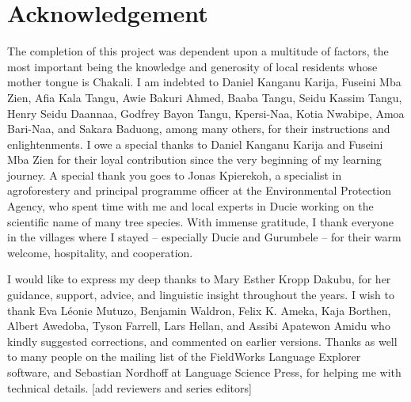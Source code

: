 \chapter*{Acknowledgement}
\label{sec:acknow}


The completion of this project was dependent upon a multitude of factors, the 
most important being  the  knowledge and generosity of local residents whose 
mother tongue is Chakali. I am  indebted to  Daniel Kanganu Karija,   Fuseini 
Mba Zien, Afia Kala Tangu,  Awie Bakuri Ahmed,   Baaba Tangu, Seidu Kassim 
Tangu, Henry Seidu Daannaa, Godfrey Bayon Tangu,  Kpersi-Naa, Kotia Nwabipe, 
Amoa Bari-Naa,  and Sakara Baduong, among many others,  for their instructions 
and enlightenments. I owe a special thanks to Daniel Kanganu Karija and  Fuseini 
Mba Zien for their loyal contribution since the very beginning of my learning 
journey. A special thank you goes  to Jonas Kpierekoh, a specialist in 
agroforestery and principal programme officer at the  Environmental Protection 
Agency, who spent time with me and local experts in Ducie working on the 
scientific name of many tree species.  With immense gratitude, I  thank 
everyone in the villages where I stayed -- especially Ducie and Gurumbele --  
for their warm welcome, hospitality,  and cooperation. 

I would like to express my deep thanks to  Mary Esther Kropp Dakubu,  for her 
guidance, support,  advice,  and  linguistic insight throughout the years.   I 
wish to thank Eva Léonie Mutuzo, Benjamin Waldron,  Felix K. Ameka,  Kaja 
Borthen, Albert 
Awedoba,  Tyson Farrell, Lars Hellan, and Assibi Apatewon Amidu who kindly 
suggested 
corrections, and commented on  earlier versions.  Thanks as well to many people 
on the mailing list of the FieldWorks Language Explorer software, and  
Sebastian Nordhoff at  Language Science Press,  for helping me with 
technical details. [add reviewers and series editors]



% 

